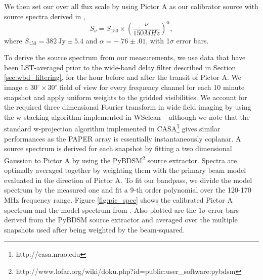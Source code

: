\documentclass[twocolumn,numberedappendix]{emulateapj} \shorttitle{PSA64}
\begin{document}
We then set our over all flux scale by using Pictor A as our calibrator source
with source spectra derived in \citet{jacobs_et_al2013}, 
\begin{equation}
    S_{\nu} = S_{150}\times\left(\frac{\nu}{150MHz}\right)^{\alpha},
\end{equation}
where $S_{150} = 382~\text{Jy} \pm 5.4$ and $\alpha = -.76 \pm .01$, with
1$\sigma$ error bars.



To derive the source spectrum from our measurements, we use data that have been
LST-averaged prior to the wide-band delay filter described in Section
\ref{sec:wbd_filtering}, for the hour before and after the transit of Pictor A.
We image a $30^\circ \times 30^\circ$ field of view for every frequency channel
for each 10 minute snapshot and apply uniform weights to the gridded
visibilities. We account for the required three dimensional Fourier transform in
wide field imaging by using the w-stacking algorithm implemented in WSclean
\citep{offringa_et_al2014} – although we note that the standard w-projection
algorithm implemented in CASA\footnote{http://casa.nrao.edu} gives similar
performances as the PAPER array is essentially instantaneously coplanar.  A
source spectrum is derived for each snapshot by fitting a two dimensional
Gaussian to Pictor A by using the
PyBDSM\footnote{http://www.lofar.org/wiki/doku.php?id=public:user\_software:pybdsm}
source extractor. Spectra are optimally averaged together by weighting them with
the primary beam model evaluated in the direction of Pictor A. To fit our
bandpass, we divide the model spectrum by the measured one and fit a 9-th order
polynomial over the 120-170 MHz frequency range. Figure \ref{fig:pic_spec} shows
the calibrated Pictor A spectrum and the model spectrum from
\citet{jacobs_et_al2013}. Also plotted are the $1\sigma$ error bars derived from the PyBDSM source extractor and averaged over the multiple snapshots used after being weighted by the beam-squared.
\end{document}
